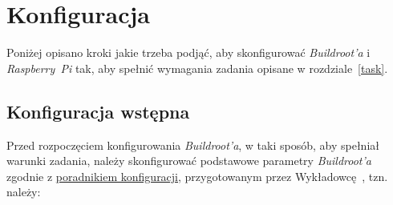 \documentclass{article}
\begin{document}

\section{Konfiguracja}

Poniżej opisano kroki jakie trzeba podjąć, aby skonfigurować \emph{Buildroot'a} i \emph{Raspberry~Pi} tak, aby spełnić wymagania zadania opisane w rozdziale~\ref{task}.


\subsection{Konfiguracja wstępna}

Przed rozpoczęciem konfigurowania \emph{Buildroot'a}, w taki sposób, aby spełniał warunki zadania, należy skonfigurować podstawowe parametry \emph{Buildroot'a} zgodnie z \href{http://wzab.cba.pl/LINSW/poradnik\_laboratorium.pdf}{poradnikiem konfiguracji}, przygotowanym przez Wykładowcę~\cite{www:wzab}, tzn. należy:
\end{document}
